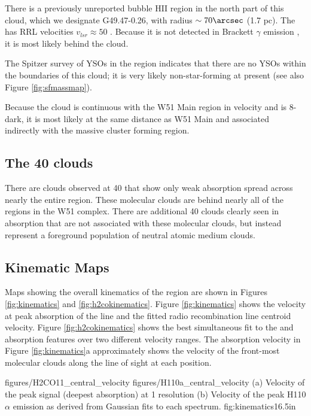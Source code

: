 There is a previously unreported bubble HII region in the north part of this
cloud, which we designate G49.47-0.26, with radius $\sim70\arcsec$ (1.7 pc).
The \hii has RRL velocities $v_{lsr}\approx50$ \kms.  Because it is not detected
in Brackett $\gamma$ emission \citep[from the UWISH2
survey:][]{Froebrich2011a}, it is most likely behind the cloud.

The \citet{Kang2009a} Spitzer survey of YSOs in the region indicates that there
are no YSOs within the boundaries of this cloud; it is very likely
non-star-forming at present (see also Figure \ref{fig:sfmassmap}).

Because the cloud is continuous with the W51 Main region in velocity and is
8\um-dark, it is most likely at the same distance as W51 Main and
associated indirectly with the massive cluster forming region.

\subsection{The 40 \kms clouds}
There are clouds observed at 40 \kms that show only weak \formaldehyde
absorption spread across nearly the entire region.  These molecular clouds are
behind nearly all of the \hii regions in the W51 complex.  There are additional
40 \kms clouds clearly seen in \hi absorption \citep{Stil2006a} that are not
associated with these molecular clouds, but instead represent a foreground
population of neutral atomic medium clouds.

\subsection{Kinematic Maps}
\label{sec:kinematics}
Maps showing the overall kinematics of the region are shown in Figures
\ref{fig:kinematics} and \ref{fig:h2cokinematics}.  Figure \ref{fig:kinematics}
shows the velocity at peak absorption of the \formaldehyde \oneone line and the
fitted radio recombination line centroid velocity.  Figure
\ref{fig:h2cokinematics} shows the best simultaneous fit to the \formaldehyde
\oneone and \twotwo absorption features over two different velocity ranges.
The \oneone absorption velocity in Figure \ref{fig:kinematics}a approximately
shows the velocity of the front-most molecular clouds along the line of sight
at each position.

\FigureTwoAA
{figures/H2CO11_central_velocity}
{figures/H110a_central_velocity}
{(a) Velocity of the peak \formaldehyde \oneone signal (deepest absorption) at
1 \kms resolution
(b) Velocity of the peak H110$\alpha$ emission as derived from Gaussian fits
to each spectrum.}
{fig:kinematics}{1}{6.5in}

